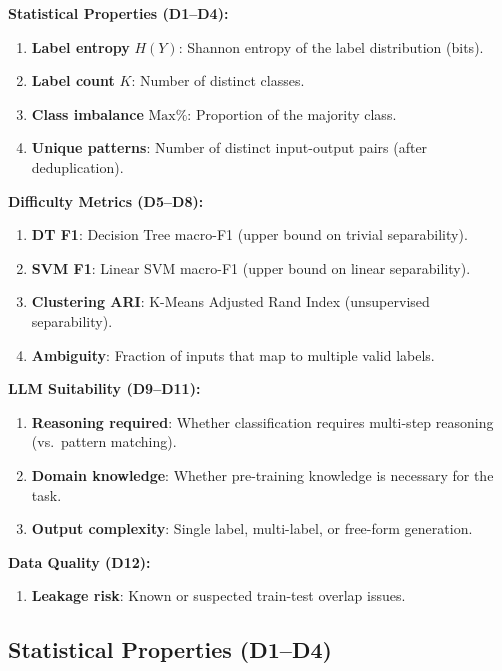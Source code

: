 \documentclass[journal]{IEEEtran}
\begin{document}
\textbf{Statistical Properties (D1--D4):}
\begin{enumerate}
\item[D1.] \textbf{Label entropy} $H(Y)$: Shannon entropy of the label distribution (bits).
\item[D2.] \textbf{Label count} $K$: Number of distinct classes.
\item[D3.] \textbf{Class imbalance} $\text{Max}\%$: Proportion of the majority class.
\item[D4.] \textbf{Unique patterns}: Number of distinct input-output pairs (after deduplication).
\end{enumerate}

\textbf{Difficulty Metrics (D5--D8):}
\begin{enumerate}
\item[D5.] \textbf{DT F1}: Decision Tree macro-F1 (upper bound on trivial separability).
\item[D6.] \textbf{SVM F1}: Linear SVM macro-F1 (upper bound on linear separability).
\item[D7.] \textbf{Clustering ARI}: K-Means Adjusted Rand Index (unsupervised separability).
\item[D8.] \textbf{Ambiguity}: Fraction of inputs that map to multiple valid labels.
\end{enumerate}

\textbf{LLM Suitability (D9--D11):}
\begin{enumerate}
\item[D9.] \textbf{Reasoning required}: Whether classification requires multi-step reasoning (vs.\ pattern matching).
\item[D10.] \textbf{Domain knowledge}: Whether pre-training knowledge is necessary for the task.
\item[D11.] \textbf{Output complexity}: Single label, multi-label, or free-form generation.
\end{enumerate}

\textbf{Data Quality (D12):}
\begin{enumerate}
\item[D12.] \textbf{Leakage risk}: Known or suspected train-test overlap issues.
\end{enumerate}

\subsection{Statistical Properties (D1--D4)}
\end{document}
